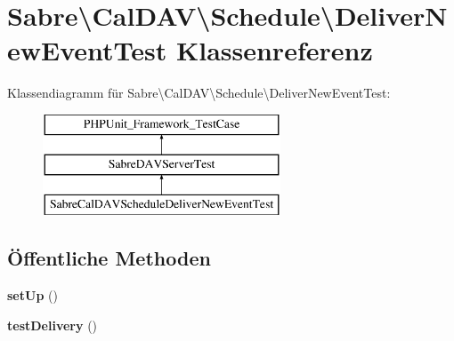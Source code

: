 \hypertarget{class_sabre_1_1_cal_d_a_v_1_1_schedule_1_1_deliver_new_event_test}{}\section{Sabre\textbackslash{}Cal\+D\+AV\textbackslash{}Schedule\textbackslash{}Deliver\+New\+Event\+Test Klassenreferenz}
\label{class_sabre_1_1_cal_d_a_v_1_1_schedule_1_1_deliver_new_event_test}
Klassendiagramm für Sabre\textbackslash{}Cal\+D\+AV\textbackslash{}Schedule\textbackslash{}Deliver\+New\+Event\+Test\+:\begin{figure}[H]
\begin{center}
\leavevmode
\includegraphics[height=3.000000cm]{class_sabre_1_1_cal_d_a_v_1_1_schedule_1_1_deliver_new_event_test}
\end{center}
\end{figure}
\subsection*{Öffentliche Methoden}
\begin{DoxyCompactItemize}
\item 
\mbox{\label{class_sabre_1_1_cal_d_a_v_1_1_schedule_1_1_deliver_new_event_test_aa1cb361ea4baf97d771e6c6be1e84ca8}} 
{\bfseries set\+Up} ()
\item 
\mbox{\label{class_sabre_1_1_cal_d_a_v_1_1_schedule_1_1_deliver_new_event_test_ab4ff1f694611ad3a69369a31e67176ee}} 
{\bfseries test\+Delivery} ()
\end{DoxyCompactItemize}

